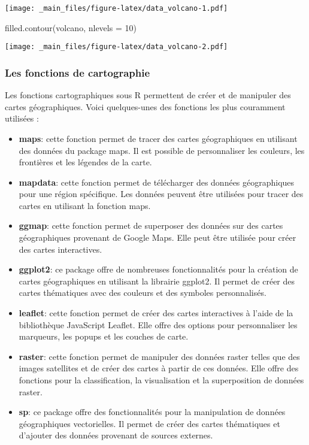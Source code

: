 \documentclass[
]{article}
\newenvironment{Shaded}{\begin{snugshade}}{\end{snugshade}}
\newcommand{\AttributeTok}[1]{\textcolor[rgb]{0.77,0.63,0.00}{#1}}
\newcommand{\DecValTok}[1]{\textcolor[rgb]{0.00,0.00,0.81}{#1}}
\newcommand{\FunctionTok}[1]{\textcolor[rgb]{0.00,0.00,0.00}{#1}}
\newcommand{\NormalTok}[1]{#1}
\begin{document}
\texttt{[image: \_main\_files/figure-latex/data\_volcano-1.pdf]}

\begin{Shaded}
\begin{Highlighting}[]
\FunctionTok{filled.contour}\NormalTok{(volcano,}
               \AttributeTok{nlevels =} \DecValTok{10}\NormalTok{)}
\end{Highlighting}
\end{Shaded}

\texttt{[image: \_main\_files/figure-latex/data\_volcano-2.pdf]}

\hypertarget{les-fonctions-de-cartographie}{%
\subsubsection{Les fonctions de cartographie}\label{les-fonctions-de-cartographie}}

Les fonctions cartographiques sous R permettent de créer et de manipuler des cartes géographiques. Voici quelques-unes des fonctions les plus couramment utilisées :

\begin{itemize}
\item
  \textbf{maps}: cette fonction permet de tracer des cartes géographiques en utilisant des données du package maps. Il est possible de personnaliser les couleurs, les frontières et les légendes de la carte.
\item
  \textbf{mapdata}: cette fonction permet de télécharger des données géographiques pour une région spécifique. Les données peuvent être utilisées pour tracer des cartes en utilisant la fonction maps.
\item
  \textbf{ggmap}: cette fonction permet de superposer des données sur des cartes géographiques provenant de Google Maps. Elle peut être utilisée pour créer des cartes interactives.
\item
  \textbf{ggplot2}: ce package offre de nombreuses fonctionnalités pour la création de cartes géographiques en utilisant la librairie ggplot2. Il permet de créer des cartes thématiques avec des couleurs et des symboles personnalisés.
\item
  \textbf{leaflet}: cette fonction permet de créer des cartes interactives à l'aide de la bibliothèque JavaScript Leaflet. Elle offre des options pour personnaliser les marqueurs, les popups et les couches de carte.
\item
  \textbf{raster}: cette fonction permet de manipuler des données raster telles que des images satellites et de créer des cartes à partir de ces données. Elle offre des fonctions pour la classification, la visualisation et la superposition de données raster.
\item
  \textbf{sp}: ce package offre des fonctionnalités pour la manipulation de données géographiques vectorielles. Il permet de créer des cartes thématiques et d'ajouter des données provenant de sources externes.
\end{itemize}
\end{document}
